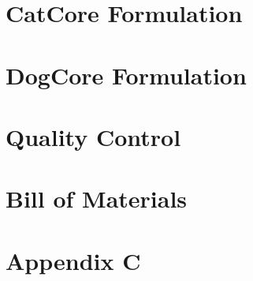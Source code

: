\documentclass[11pt,oneside]{book}
\begin{document}
\frontmatter
\tableofcontents
\listoftables

\mainmatter

\chapter{CatCore Formulation}


\chapter{DogCore Formulation}


\setcounter{chapter}{8}

\chapter{Quality Control}



\setcounter{chapter}{9}
\chapter{Bill of Materials}



\appendix
\setcounter{chapter}{2}
\chapter{Appendix C}

\end{document}
